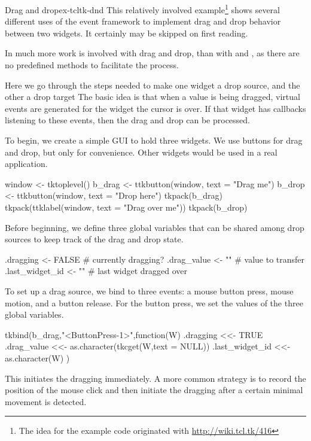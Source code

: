 \begin{example}{Drag and drop}{ex-tcltk-dnd}
This relatively involved example\footnote{The idea for the example
  code originated with \url{http://wiki.tcl.tk/416}} shows several
different uses of the event framework to implement drag and drop
behavior between two widgets. It certainly may be skipped on first reading.


In  much more work is involved with drag and drop, than
with  and , as there are no predefined methods
to facilitate the process. 

Here we go through the steps needed to make one widget a drop source,
and the other a drop target The basic idea is that when a value is
being dragged, virtual events are generated for the widget the cursor
is over. If that widget has callbacks listening to these events, then the
drag and drop can be processed.


To begin, we create a simple GUI to hold three widgets. We use buttons
for drag and drop, but only for convenience. Other widgets would be
used in a real application.
\begin{Schunk}
\begin{Sinput}
 window <- tktoplevel()
 b_drag <- ttkbutton(window, text = "Drag me")
 b_drop <- ttkbutton(window, text = "Drop here")
 tkpack(b_drag)
 tkpack(ttklabel(window, text = "Drag over me"))
 tkpack(b_drop)
\end{Sinput}
\end{Schunk}
%

Before beginning, we define three global variables that can be shared
among drop sources to keep track of the drag and drop state. 
\begin{Schunk}
\begin{Sinput}
 .dragging <- FALSE                 # currently dragging?
 .drag_value <- ""                   # value to transfer
 .last_widget_id <- ""                # last widget dragged over
\end{Sinput}
\end{Schunk}
%
%
To set up a drag source, we bind to three events: a mouse button
press, mouse motion, and a button release. For the button press, we
set the values of the three global variables.
\begin{Schunk}
\begin{Sinput}
 tkbind(b_drag,"<ButtonPress-1>",function(W) {
   .dragging <<-  TRUE
   .drag_value <<- as.character(tkcget(W,text = NULL))
   .last_widget_id <<- as.character(W)
 })
\end{Sinput}
\end{Schunk}
%
This initiates the dragging immediately. A more common strategy is to
record the position of the mouse click and then initiate the dragging
after a certain minimal movement is detected.


\end{example}
